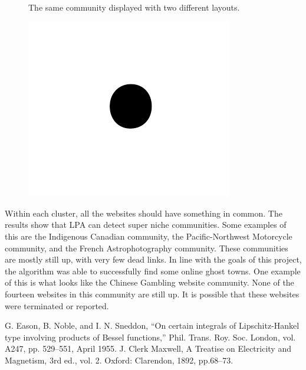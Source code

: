 \documentclass[conference]{IEEEtran}
\begin{document}
\begin{figure}[htbp]
    \centering
    \\
    \caption{The same community displayed with two different layouts.}
    \label{fig}
    
\centerline{\includegraphics{fig1.png}}
\caption{}
\label{Figure X2}
\end{figure}

Within each cluster, all the websites should have something in common. The results show that LPA can detect super niche communities. Some examples of this are the Indigenous Canadian community, the Pacific-Northwest Motorcycle community, and the French Astrophotography community. These communities are mostly still up, with very few dead links. In line with the goals of this project, the algorithm was able to successfully find some online ghost towns. One example of this is what looks like the Chinese Gambling website community. None of the fourteen websites in this community are still up. It is possible that these websites were terminated or reported.

\begin{thebibliography}{00}
 G. Eason, B. Noble, and I. N. Sneddon, ``On certain integrals of Lipschitz-Hankel type involving products of Bessel functions,'' Phil. Trans. Roy. Soc. London, vol. A247, pp. 529--551, April 1955.
 J. Clerk Maxwell, A Treatise on Electricity and Magnetism, 3rd ed., vol. 2. Oxford: Clarendon, 1892, pp.68--73.
\end{thebibliography}
\end{document}
